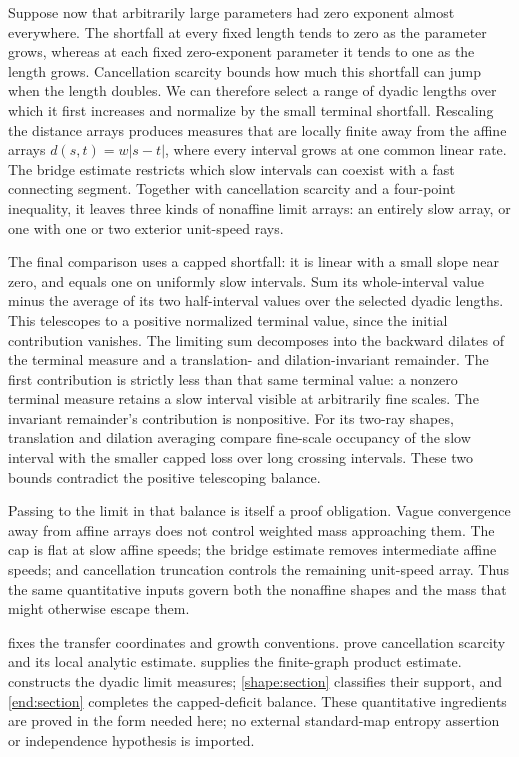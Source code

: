 Suppose now that arbitrarily large parameters had zero exponent almost
everywhere. The shortfall at every fixed length tends to zero as the
parameter grows, whereas at each fixed zero-exponent parameter it tends
to one as the length grows. Cancellation scarcity bounds how much this
shortfall can jump when the length doubles. We can therefore select a
range of dyadic lengths over which it first increases and normalize by
the small terminal shortfall. Rescaling the distance arrays produces
measures that are locally finite away from the affine arrays
$d(s,t)=w|s-t|$, where every interval grows at one common linear rate.
The bridge estimate restricts which slow intervals can coexist with a
fast connecting segment. Together with cancellation scarcity and a
four-point inequality, it leaves three kinds of nonaffine limit arrays:
an entirely slow array, or one with one or two exterior unit-speed rays.

The final comparison uses a capped shortfall: it is linear with a small
slope near zero, and equals one on uniformly slow intervals. Sum its
whole-interval value minus the average of its two half-interval values
over the selected dyadic lengths. This telescopes to a positive
normalized terminal value, since the initial contribution vanishes.
The limiting sum decomposes into the backward dilates of the terminal
measure and a translation- and dilation-invariant remainder. The first
contribution is strictly less than that same terminal value: a nonzero
terminal measure retains a slow interval visible at arbitrarily fine
scales. The invariant remainder's contribution is nonpositive. For its two-ray shapes,
translation and dilation averaging compare fine-scale occupancy of the
slow interval with the smaller capped loss over long crossing intervals.
These two bounds contradict the positive telescoping balance.

Passing to the limit in that balance is itself a proof obligation.
Vague convergence away from affine arrays does not control weighted mass
approaching them. The cap is flat at slow affine speeds; the bridge
estimate removes intermediate affine speeds; and cancellation truncation
controls the remaining unit-speed array. Thus the same quantitative
inputs govern both the nonaffine shapes and the mass that might otherwise
escape them.

 fixes the transfer coordinates and growth conventions.
 prove cancellation scarcity and its local
analytic estimate.  supplies the finite-graph
product estimate.  constructs the dyadic limit measures;
\cref{shape:section} classifies their support, and \cref{end:section}
completes the capped-deficit balance. These quantitative ingredients
are proved in the form needed here; no external standard-map entropy
assertion or independence hypothesis is imported.
